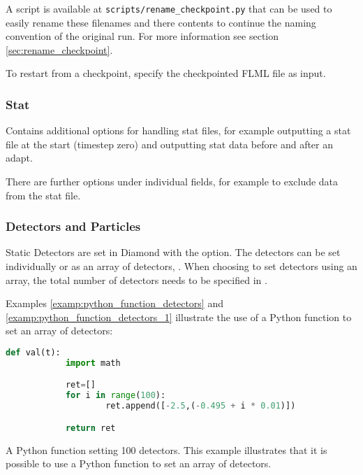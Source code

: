 A script is available at \lstinline[language = bash]+scripts/rename_checkpoint.py+ 
that can be used to easily rename these filenames and there contents to continue 
the naming convention of the original run. For more information see section 
\ref{sec:rename_checkpoint}.

To restart from a checkpoint, specify the checkpointed FLML file as input.

\subsubsection{Stat}
Contains additional options for handling stat files, for example outputting
a stat file at the start (timestep zero) and outputting stat data before and
after an adapt.

There are further options under individual fields, for example to exclude data from the stat file.

\subsubsection{Detectors and Particles}
\label{detectors_options}

Static Detectors are set in Diamond with the  option. The detectors can be set individually or as an array of detectors, . When choosing to set detectors using an array, the total number of detectors needs to be specified in .

Examples \ref{examp:python_function_detectors} and
\ref{examp:python_function_detectors_1} illustrate the use of a Python
function to set an array of detectors:

\begin{example}
  \begin{lstlisting}[language=Python]
def val(t):
            import math

            ret=[]
            for i in range(100):
                    ret.append([-2.5,(-0.495 + i * 0.01)])

            return ret
  \end{lstlisting}
  \caption{A Python function setting 100 detectors. This
  example illustrates that it is possible to use a Python function to set an array of detectors.}
  \label{examp:python_function_detectors}
\end{example}

